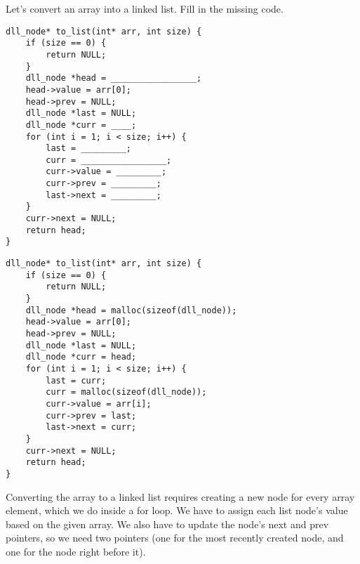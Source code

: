\begin{blocksection}
\question
Let's convert an array into a linked list. Fill in the missing code.

\begin{verbatim}
dll_node* to_list(int* arr, int size) {
    if (size == 0) {
        return NULL;
    }
    dll_node *head = _________________;
    head->value = arr[0];
    head->prev = NULL;
    dll_node *last = NULL;
    dll_node *curr = ____;
    for (int i = 1; i < size; i++) {
        last = _________;
        curr = _________________;
        curr->value = _________;
        curr->prev = _________;
        last->next = _________;
    }
    curr->next = NULL;
    return head;
}
\end{verbatim}
\end{blocksection}
\begin{blocksection}
\begin{solution}
\begin{verbatim}
dll_node* to_list(int* arr, int size) {
    if (size == 0) {
        return NULL;
    }
    dll_node *head = malloc(sizeof(dll_node));
    head->value = arr[0];
    head->prev = NULL;
    dll_node *last = NULL;
    dll_node *curr = head;
    for (int i = 1; i < size; i++) {
        last = curr;
        curr = malloc(sizeof(dll_node));
        curr->value = arr[i];
        curr->prev = last;
        last->next = curr;
    }
    curr->next = NULL;
    return head;
}
\end{verbatim}
Converting the array to a linked list requires creating a new node for every array element, which we do inside a for loop. We have to assign each list node's value based on the given array. We also have to update the node's next and prev pointers, so we need two pointers (one for the most recently created node, and one for the node right before it).
\end{solution}
\end{blocksection}